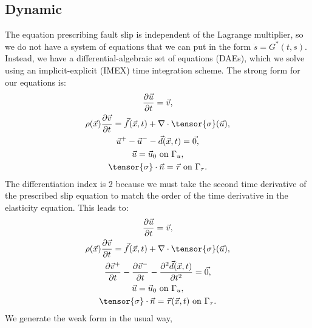 \subsection{Dynamic}

The equation prescribing fault slip is independent of the Lagrange
multiplier, so we do not have a system of equations that we can put in
the form $\dot{s} = G^*(t,s)$. Instead, we have a
differential-algebraic set of equations (DAEs), which we solve using an
implicit-explicit (IMEX) time integration scheme. The strong form for
our equations is:
\begin{gather}
  \frac{\partial \vec{u}}{\partial t} = \vec{v}, \\
  \rho(\vec{x}) \frac{\partial \vec{v}}{\partial t} =
  \vec{f}(\vec{x},t) + \nabla \cdot \tensor{\sigma}(\vec{u}), \\
  \vec{u}^+ - \vec{u}^- - \vec{d}(\vec{x},t) = \vec{0,} \\
  \vec{u} = \vec{u}_0 \text{ on } \Gamma_u, \\
  \tensor{\sigma} \cdot \vec{n} = \vec{\tau} \text{ on } \Gamma_\tau.
\end{gather}
The differentiation index is 2 because we must take the second time
derivative of the prescribed slip equation to match the order of the
time derivative in the elasticity equation. This leads to:
\begin{gather}
  \frac{\partial \vec{u}}{\partial t} = \vec{v}, \\
  \label{eqn:dynamic:strong:form:elasticity}
  \rho(\vec{x}) \frac{\partial \vec{v}}{\partial t} =
  \vec{f}(\vec{x},t) + \nabla \cdot \tensor{\sigma}(\vec{u}), \\
  \label{eqn:dynamic:strong:form:prescribed:slip}
  \frac{\partial \vec{v}^+}{\partial t} - \frac{\partial \vec{v}^-}{\partial t} -
  \frac{\partial^2 \vec{d}(\vec{x},t)}{\partial t^2} = \vec{0,} \\
  \vec{u} = \vec{u}_0 \text{ on } \Gamma_u, \\
  \tensor{\sigma} \cdot \vec{n} = \vec{\tau}(\vec{x},t) \text{ on } \Gamma_\tau.
\end{gather}
We generate the weak form in the usual way,
